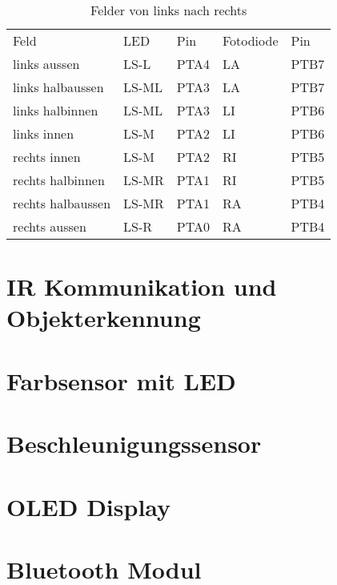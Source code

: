 \documentclass[a4paper,10pt,fleqn]{article}
\begin{document}
\begin{table}[h!]
\begin{tabular}{lllll}
\rowcolor{white} Feld               & LED   & Pin   & Fotodiode & Pin   \\
\rowcolor{lgray} links aussen       & LS-L  & PTA4  & LA        & PTB7  \\
\rowcolor{white} links halbaussen   & LS-ML & PTA3  & LA        & PTB7  \\
\rowcolor{lgray} links halbinnen    & LS-ML & PTA3  & LI        & PTB6  \\
\rowcolor{white} links innen        & LS-M  & PTA2  & LI        & PTB6  \\
\rowcolor{lgray} rechts innen       & LS-M  & PTA2  & RI        & PTB5  \\
\rowcolor{white} rechts halbinnen   & LS-MR & PTA1  & RI        & PTB5  \\
\rowcolor{lgray} rechts halbaussen  & LS-MR & PTA1  & RA        & PTB4  \\
\rowcolor{white} rechts aussen      & LS-R  & PTA0  & RA        & PTB4  \\
\end{tabular}
\caption{Felder von links nach rechts}
\end{table}


\section{IR Kommunikation und Objekterkennung}

\section{Farbsensor mit LED}

\section{Beschleunigungssensor}

\section{OLED Display}

\section{Bluetooth Modul}
\end{document}
